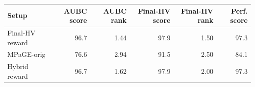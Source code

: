 \begin{tabular}{lrrrrr}
\toprule
Setup & AUBC score & AUBC rank & Final-HV score & Final-HV rank & Perf. score \\
\midrule
Final-HV reward & 96.7 & 1.44 & 97.9 & 1.50 & 97.3 \\
MPaGE-orig & 76.6 & 2.94 & 91.5 & 2.50 & 84.1 \\
Hybrid reward & 96.7 & 1.62 & 97.9 & 2.00 & 97.3 \\
\bottomrule
\end{tabular}
